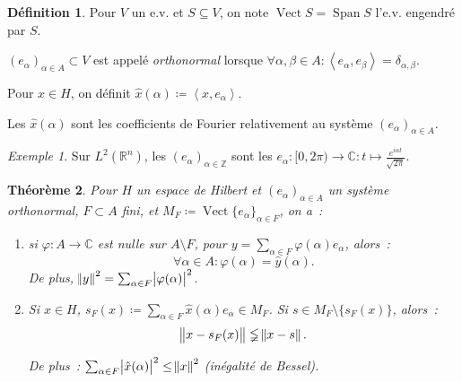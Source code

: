 \documentclass{report}
\DeclareMathOperator{\Vect}{Vect}
\DeclareMathOperator{\Span}{Span}
\newcommand{\C}{{\mathbb C}}
\newcommand{\R}{{\mathbb R}}
\newcommand{\Z}{{\mathbb Z}}
\newcommand{\scpr}[2]{\left\langle#1, #2\right\rangle}
\newtheorem{thm}{Théorème}[chapter]
\theoremstyle{definition}
\newtheorem{déf}[thm]{Définition}
\theoremstyle{remark}
\newtheorem{ex}{Exemple}[chapter]
\begin{document}
\begin{déf} Pour $V$ un e.v. et $S \subseteq V$, on note $\Vect S = \Span S$ l'e.v. engendré par $S$.

$(e_\alpha)_{\alpha \in A} \subset V$ est appelé \textit{orthonormal} lorsque $\forall \alpha, \beta \in A : \scpr {e_\alpha}{e_\beta} = \delta_{\alpha,\beta}$.

Pour $x \in H$, on définit $\hat x(\alpha) \coloneqq \scpr x{e_\alpha}$.
\end{déf}

Les $\hat x(\alpha)$ sont les coefficients de Fourier relativement au système $(e_\alpha)_{\alpha \in A}$.

\begin{ex} Sur $L^2(\R^n)$, les $(e_\alpha)_{\alpha \in \Z}$ sont les $e_\alpha : [0, 2\pi) \to \C : t \mapsto \frac {e^{i\alpha t}}{\sqrt {2\pi}}$.
\end{ex}

\begin{thm} Pour $H$ un espace de Hilbert et $(e_\alpha)_{\alpha \in A}$ un système orthonormal, $F \subset A$ fini, et $M_F \coloneqq \Vect {\{e_\alpha\}}_{\alpha \in F}$, on a~:
\begin{enumerate}
	\item si $\varphi : A \to \C$ est nulle sur $A \setminus F$, pour $y = \sum_{\alpha \in F}\varphi(\alpha)e_\alpha$, alors~:
	\[\forall \alpha \in A : \varphi(\alpha) = \hat y(\alpha).\]
	De plus, $\norm y^2 = \sum_{\alpha \in F}\abs {\varphi(\alpha)}^2$.

	\item Si $x \in H$, $s_F(x) \coloneqq \sum_{\alpha \in F}\hat x(\alpha)e_\alpha \in M_F$. Si $s \in M_F \setminus \{s_F(x)\}$, alors~:
	\[\norm {x-s_F(x)} \lneqq \norm {x-s}.\]

	De plus~: $\sum_{\alpha \in F}\abs {\hat x(\alpha)}^2 \leq \norm x^2$ (inégalité de Bessel).
\end{enumerate}
\end{thm}
\end{document}
